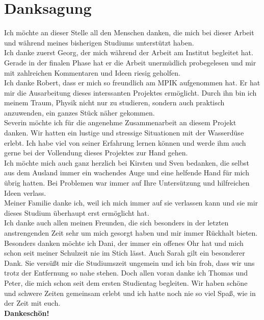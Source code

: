 
\thispagestyle{empty}

\section*{Danksagung}

Ich möchte an dieser Stelle all den Menschen danken, die mich bei dieser Arbeit und während meines bisherigen Studiums unterstützt haben. \\

Ich danke zuerst Georg, der mich während der Arbeit am Institut begleitet hat. Gerade in der finalen Phase hat er die Arbeit unermüdlich probegelesen und mir mit zahlreichen Kommentaren und Ideen riesig geholfen.\\

Ich danke Robert, dass er mich so freundlich am MPIK aufgenommen hat. Er hat mir die Ausarbeitung dieses interssanten Projektes ermöglicht. Durch ihn bin ich meinem Traum, Physik nicht nur zu studieren, sondern auch praktisch anzuwenden, ein ganzes Stück näher gekommen.\\

Severin möchte ich für die angenehme Zusammenarbeit an diesem Projekt danken. Wir hatten ein lustige und stressige Situationen mit der Wasserdüse erlebt. Ich habe viel von seiner Erfahrung lernen können und werde ihm auch gerne bei der Vollendung dieses Projektes zur Hand gehen.\\

Ich möchte mich auch ganz herzlich bei Kirsten und Sven bedanken, die selbst aus dem Ausland immer ein wachendes Auge und eine helfende Hand für mich übrig hatten. Bei Problemen war immer auf Ihre Untersützung und hilfreichen Ideen verlass.\\

Meiner Familie danke ich, weil ich mich immer auf sie verlassen kann und sie mir dieses Studium überhaupt erst ermöglicht hat.\\

Ich danke auch allen meinen Freunden, die sich besonders in der letzten anstrengenden Zeit sehr um mich gesorgt haben und mir immer Rückhalt bieten. Besonders danken möchte ich Dani, der immer ein offenes Ohr hat und mich schon seit meiner Schulzeit nie im Stich lässt.
Auch Sarah gilt ein besonderer Dank. Sie versüßt mir die Studiumszeit ungemein und ich bin froh, dass wir uns trotz der Entfernung so nahe stehen. Doch allen voran danke ich Thomas und Peter, die mich schon seit dem ersten Studientag begleiten. Wir haben schöne und schwere Zeiten gemeinsam erlebt und ich hatte noch nie so viel Spaß, wie in der Zeit mit euch.\\

\textbf{Dankeschön!}
\cleardoublepage